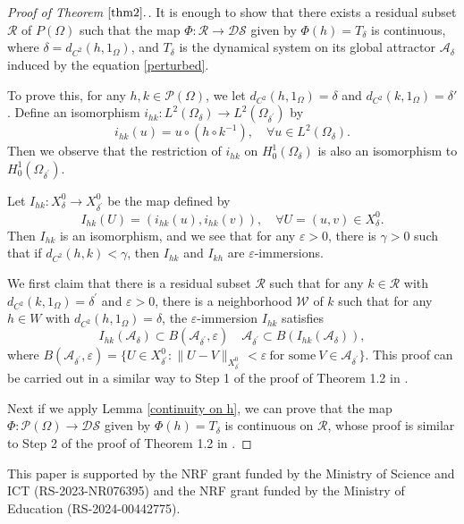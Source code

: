 \documentclass[11pt]{amsart}
\begin{document}
\begin{proof}[Proof of Theorem $\ref{thm2}.$]
It is enough to show that there exists a residual subset $\mathcal R$ of $P(\Omega)$ such that the map $\Phi:\mathcal R \to  \mathcal{DS}$ given by $\Phi(h) = T_\delta$ is continuous, where $\delta=d_{C^2}(h, 1_{\Omega})$, and $T_\delta$ is the dynamical system on its global attractor $\mathcal {A}_\delta$ induced by the equation \eqref{perturbed}.

To prove this, for any $h, k \in \mathcal{P}(\Omega)$, we let $ d_{C^2}(h,1_{\Omega})=\delta$ and $d_{C^2}(k,1_{\Omega})=\delta'$. Define an isomorphism $i_{hk}: L^2(\Omega_{\delta}) \rightarrow L^2(\Omega_{\delta^\prime})$ by
$$
i_{hk}(u) = u \circ (h \circ k^{-1}),\quad \forall  u \in L^2(\Omega_\delta).
$$
Then we observe that the restriction of $i_{hk}$ on $H^1_0(\Omega_\delta)$ is also an isomorphism to $H^1_0(\Omega_{\delta^\prime})$.

Let $I_{hk}: X^0_{\delta}\rightarrow X^0_{\delta^\prime}$ be the map defined by
$$
I_{hk}(U) =(i_{hk}(u), i_{hk}(v)),\quad \forall U=(u, v) \in X^0_{\delta}.
$$
Then $I_{hk}$ is an isomorphism, and we see that for any $\varepsilon>0$, there is $\gamma>0$ such that if $d_{C^2} (h,k)< \gamma$, then $I_{hk}$ and $I_{kh}$ are $\varepsilon$-immersions.

We first claim that there is a residual subset $\mathcal R$ such that for any $k \in \mathcal R$ with $d_{C^2}(k,1_{\Omega}) = \delta^\prime$ and $\varepsilon>0$, there is a neighborhood $\mathcal W$ of $k$ such that for any $h \in W$ with $d_{C^2}(h,1_{\Omega}) = \delta$, the $\varepsilon$-immersion $I_{hk}$ satisfies
$$
I_{hk}(\mathcal A_\delta) \subset B(\mathcal A_{\delta^\prime}, \varepsilon)\quad \mathcal A_{\delta^{\prime}} \subset B(I_{hk}(\mathcal A_{\delta})),
$$
where $B(\mathcal A_{\delta^{\prime}}, \varepsilon) = \{U \in X_{\delta^\prime}^0: \| U-V\|_{X_{\delta^{\prime}}^0} < \varepsilon ~ \mbox{for~some}~V \in  \mathcal A_{\delta^\prime}\}$.
This proof can be carried out in a similar way to Step 1 of the proof of Theorem 1.2 in \cite{LNT} .

Next if we apply Lemma \ref{continuity on h}, we can prove that the map $\Phi: \mathcal{P}(\Omega) \to \mathcal{DS}$ given by $\Phi(h) =T_\delta$ is continuous on $\mathcal{R}$, whose  proof is similar to Step 2 of the proof of Theorem 1.2 in \cite{LNT}.
\end{proof}


\vskip 5mm

This paper is supported by the NRF grant funded by the Ministry of Science and ICT (RS-2023-NR076395) and the NRF grant funded by the Ministry of Education (RS-2024-00442775).
\end{document}
